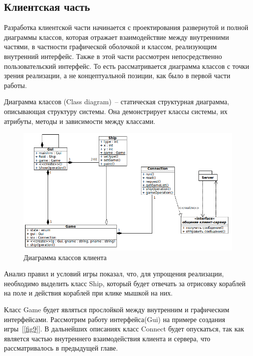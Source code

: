 ﻿\subsection{Клиентская часть}
Разработка клиентской части начинается с проектирования развернутой и полной диаграммы классов, которая отражает взаимодействие между внутренними частями, в частности графической оболочкой и классом, реализующим внутренний интерфейс. 
Также в этой части рассмотрен непосредственно пользовательский интерфейс. То есть рассматривается диаграмма классов с точки зрения реализации, а не концептуальной позиции, как было в первой части работы.

Диаграмма классов (Class diagram)~-- статическая структурная диаграмма, описывающая структуру системы. Она демонстрирует классы системы, их атрибуты, методы и зависимости между классами.

\begin{figure}[ht]
\centering
\includegraphics[width=18cm]{images/class_client.png}
\caption{Диаграмма классов клиента}
\label{fig8}
\end{figure}


Анализ правил и условий игры показал, что, для упрощения реализации, необходимо выделить класс Ship, который будет отвечать за отрисовку кораблей на поле и действия кораблей при клике мышкой на них.

Класс Game будет являться прослойкой между внутренним и графическим интерфейсами. Рассмотрим работу интерфейса(Gui) на примере создания игры~[\ref{fig9}]. В дальнейших описаниях класс Connect будет опускаться, так как является частью внутреннего взаимодействия клиента и сервера, что рассматривалось в предыдущей главе.


